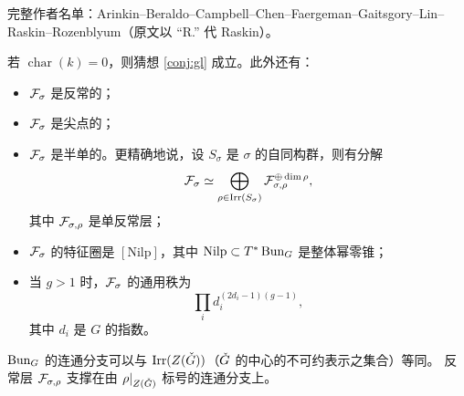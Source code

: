 \begin{theorem}[Arinkin 等]\label{thm:gl-general}
{\footnotesize\noindent 完整作者名单：Arinkin--Beraldo--Campbell--Chen--Faergeman--Gaitsgory--Lin--Raskin--Rozenblyum（原文以 ``R.'' 代 Raskin）。\par}
若 \(\operatorname{char}(k)=0\)，则猜想 \ref{conj:gl} 成立。此外还有：
\begin{itemize}
\item \(\mathcal{F}_\sigma\) 是反常的；
\item \(\mathcal{F}_\sigma\) 是尖点的；
\item \(\mathcal{F}_\sigma\) 是半单的。更精确地说，设 \(S_\sigma\) 是 \(\sigma\) 的自同构群，则有分解
\[
\mathcal{F}_\sigma\simeq\bigoplus_{\rho\in\mathrm{Irr}(S_\sigma)}\mathcal{F}_{\sigma,\rho}^{\oplus\dim\rho},
\]
其中 \(\mathcal{F}_{\sigma,\rho}\) 是单反常层；
\item \(\mathcal{F}_\sigma\) 的特征圈是 \([\mathrm{Nilp}]\)，其中 \(\mathrm{Nilp}\subset T^*\operatorname{Bun}_G\) 是整体幂零锥；
\item 当 \(g>1\) 时，\(\mathcal{F}_\sigma\) 的通用秩为
\[
\prod_i d_i^{(2d_i-1)(g-1)},
\]
其中 \(d_i\) 是 \(G\) 的指数。
\end{itemize}
\end{theorem}

\begin{remark}\label{rem:components}
\(\operatorname{Bun}_G\) 的连通分支可以与 \(\mathrm{Irr}(Z(\check{G}))\)（\(\check{G}\) 的中心的不可约表示之集合）等同。
反常层 \(\mathcal{F}_{\sigma,\rho}\) 支撑在由 \(\rho|_{Z(\check{G})}\) 标号的连通分支上。
\end{remark}
